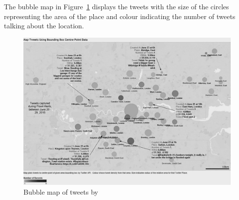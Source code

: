 The bubble map in Figure~\ref{fig:baker_bubble} displays the tweets with the size of the circles
representing the area of the place and colour indicating the number of tweets talking about the
location.
\begin{figure}[H]
\begin{center}
  \includegraphics[width=13cm]{./images/baker_bubble.png}
\end{center}
\caption{Bubble map of tweets by }
\label{fig:baker_bubble}
\end{figure}
